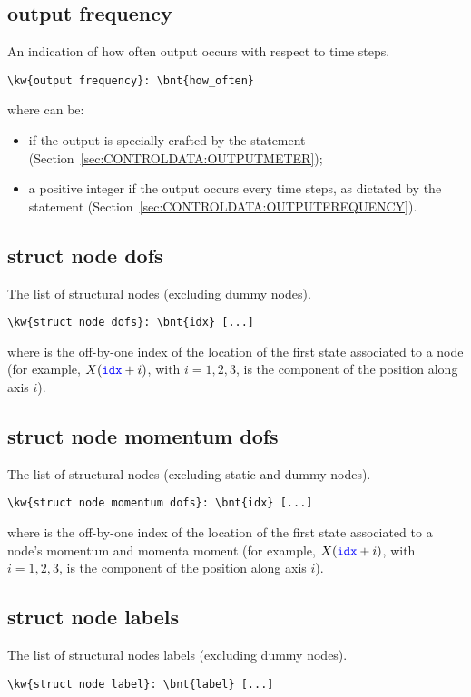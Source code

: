 \subsection{output frequency}
An indication of how often output occurs with respect to time steps.
\begin{Verbatim}[commandchars=\\\{\}]
\kw{output frequency}: \bnt{how_often}
\end{Verbatim}
where  can be:
\begin{itemize}
\item {} if the output is specially crafted by the
 statement (Section~\ref{sec:CONTROLDATA:OUTPUTMETER});
\item a positive integer if the output occurs every 
time steps, as dictated by the  statement
(Section~\ref{sec:CONTROLDATA:OUTPUTFREQUENCY}).
\end{itemize}

\subsection{struct node dofs}
The list of structural nodes (excluding dummy nodes).
\begin{Verbatim}[commandchars=\\\{\}]
\kw{struct node dofs}: \bnt{idx} [...]
\end{Verbatim}
where  is the off-by-one index of the location of the first
state associated to a node (for example, $X(\textcolor{blue}{\texttt{idx}} + i)$, with $i = 1,2,3$,
is the component of the position along axis $i$).

\subsection{struct node momentum dofs}
The list of structural nodes (excluding static and dummy nodes).
\begin{Verbatim}[commandchars=\\\{\}]
\kw{struct node momentum dofs}: \bnt{idx} [...]
\end{Verbatim}
where  is the off-by-one index of the location of the first
state associated to a node's momentum and momenta moment
(for example, $X(\textcolor{blue}{\texttt{idx}} + i)$, with $i = 1,2,3$,
is the component of the position along axis $i$).

\subsection{struct node labels}
The list of structural nodes labels (excluding dummy nodes).
\begin{Verbatim}[commandchars=\\\{\}]
\kw{struct node label}: \bnt{label} [...]
\end{Verbatim}

